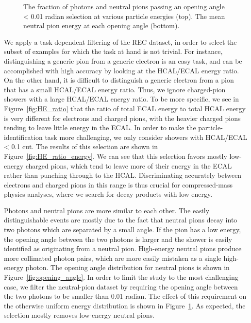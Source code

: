 \begin{figure}[htbp]
\centering
\caption{The fraction of photons and neutral pions passing an opening angle < 0.01 radian selection at various particle energies (top). The mean neutral pion energy at each opening angle (bottom).}
\label{fig:opening_angle_energy}
\end{figure}

We apply a task-dependent filtering of the REC dataset, in order to select the subset of examples for which the task at hand is not trivial. For instance, distinguishing a generic pion from a generic electron is an easy task, and can be accomplished with high accuracy by looking at the HCAL/ECAL energy ratio. On the other hand, it is difficult to distinguish a generic electron from a pion that has a small HCAL/ECAL energy ratio. Thus, we ignore charged-pion showers with a large HCAL/ECAL energy ratio. To be more specific, we see in Figure~\ref{fig:HE_ratio} that the ratio of total ECAL energy to total HCAL energy is very different for electrons and charged pions, with the heavier charged pions tending to leave little energy in the ECAL. In order to make the particle-identification task more challenging, we only consider showers with HCAL/ECAL < 0.1 cut. The results of this selection are shown in Figure~\ref{fig:HE_ratio_energy}. We can see that this selection favors mostly low-energy charged pions, which tend to leave more of their energy in the ECAL rather than punching through to the HCAL. Discriminating accurately between electrons and charged pions in this range is thus crucial for compressed-mass physics analyses, where we search for decay products with low energy.

Photons and neutral pions are more similar to each other. The easily distinguishable events are mostly due to the fact that neutral pions decay into two photons which are separated by a small angle. If the pion has a low energy, the opening angle between the two photons is larger and the shower is easily identified as originating from a neutral pion. High-energy neutral pions produce more collimated photon pairs, which are more easily mistaken as a single high-energy photon. The opening angle distribution for neutral pions is shown in Figure~\ref{fig:opening_angle}. In order to limit the study to the most challenging case, we filter the neutral-pion dataset by requiring the opening angle between the two photons to be smaller than 0.01 radian.  The effect of  this requirement on the otherwise uniform energy distribution is shown in Figure~\ref{fig:opening_angle_energy}. As expected, the selection mostly removes low-energy neutral pions. 

